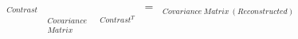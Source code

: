\documentclass[12pt]{article}
\begin{document}
 

$$
\mathop{
   \begin{bmatrix}
   1 & 0 \\
   0 & 1 \\
   -1 & -1
   \end{bmatrix}
}_{ Contrast } 
\mathop{
   \begin{bmatrix}
   \sigma_{1}^{2} & \sigma_{1 2} \\
   \sigma_{2 1} & \sigma_{2}^{2} 
   \end{bmatrix}
}_{ \substack{\phantom{S} \\ Covariance\\ Matrix } } 
\mathop{
   \begin{bmatrix}
   1 & 0 & -1 \\
   0 & 1 & -1
   \end{bmatrix}
}_{  \substack{\phantom{s} \\ Contrast^T} } 
=
\mathop{
   \begin{bmatrix}
   \sigma_{1}^{2}                 & \sigma_{1 2}                     & -\sigma_{1}^{2} - \sigma_{1 2} \\
   \sigma_{2 1}                   & \sigma_{2}^{2}                   & -\sigma_{2}^{2} - \sigma_{2 1} \\
   -\sigma_{1}^{2} - \sigma_{2 1} & -\sigma_{2}^{2} - \sigma_{1 2} & \sigma_{1}^{2} + \sigma_{2}^{2} + \sigma_{1 2} + \sigma_{2 1}
   \end{bmatrix}
}_{ \substack{ Covariance~Matrix ~ (Reconstructed) } } 
$$
\end{document}
